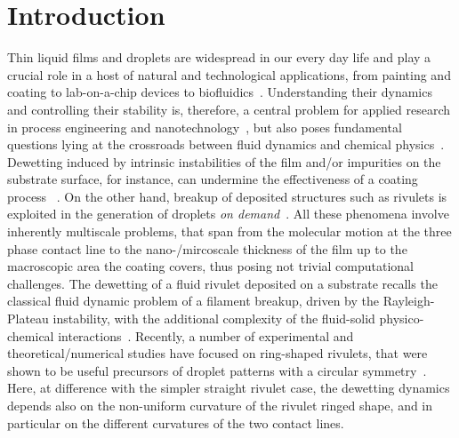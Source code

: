 \documentclass[twoside,twocolumn,9pt]{article}
\begin{document}
\section{Introduction}
\label{sec:intro}
Thin liquid films and droplets are widespread in our every day life and play a crucial role
in a host of natural and technological applications, from painting and coating to lab-on-a-chip devices to biofluidics~\cite{degennesCapillarityWettingPhenomena2004, ronsinPhaseFieldSimulationsMorphology2022,fockeLabonaFoilMicrofluidicsThin2010}.
Understanding their dynamics and controlling their stability is, therefore, a central problem for applied research in process engineering and nanotechnology~\cite{singhInkjetPrintingProcess2010, quereFluidCoatingFiber1999, utadaDrippingJettingDrops2007}, but also poses fundamental questions lying at the crossroads between fluid dynamics and chemical physics~\cite{oronLongscaleEvolutionThin1997, beckerComplexDewettingScenarios2003, thielePatternedDepositionMoving2014, wilczekSlidingDropsEnsemble2017, peschkaSignaturesSlipDewetting2019}.
Dewetting induced by intrinsic instabilities of the film and/or impurities on 
the substrate surface, for instance, can undermine the effectiveness of a coating process
~\cite{bonnWettingSpreading2009, chenWrinklingInstabilitiesPolymer2012}. 
On the other hand, breakup of deposited structures such as rivulets is exploited
in the generation of droplets {\it on demand}~\cite{}.
All these phenomena involve inherently multiscale problems, that span from the molecular motion at the three phase contact line to the nano-/mircoscale thickness of the film up to the macroscopic area the coating covers, thus posing not trivial computational challenges.
The dewetting of a fluid rivulet deposited on a substrate recalls the classical fluid dynamic 
problem of a filament breakup, driven by the Rayleigh-Plateau instability, with the additional 
complexity of the fluid-solid physico-chemical interactions~\cite{diezBreakupFluidRivulets2009, diezStabilityFinitelengthRivulet2009, diezInstabilityTransverseLiquid2012}.
Recently,  a number of experimental and theoretical/numerical studies have focused on ring-shaped 
rivulets, that were shown to be useful precursors of droplet patterns with a circular symmetry~\cite{nguyenCompetitionCollapseBreakup2012, gonzalezStabilityLiquidRing2013, wuCompetingLiquidPhase2011, edwardsControllingBreakupToroidal2021}. Here, at difference with the simpler
straight rivulet case, the dewetting dynamics depends also on the non-uniform curvature of the rivulet ringed shape,
and in particular on the different curvatures of the two contact lines.
\end{document}
